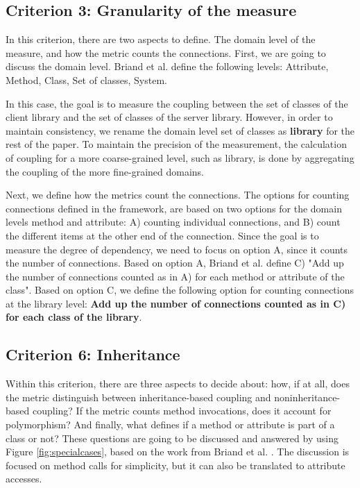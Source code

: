 \documentclass[a4paper]{article}
\begin{document}
\subsection{Criterion 3: Granularity of the measure}
In this criterion, there are two aspects to define. The domain level of the measure, and how the metric counts the connections. First, we are going to discuss the domain level. Briand et al. define the following levels: Attribute, Method, Class, Set of classes, System.

In this case, the goal is to measure the coupling between the set of classes of the client library and the set of classes of the server library. However, in order to maintain consistency, we rename the domain level set of classes as \textbf{library} for the rest of the paper. To maintain the precision of the measurement, the calculation of coupling for a more coarse-grained level, such as library, is done by aggregating the coupling of the more fine-grained domains.

Next, we define how the metrics count the connections. The options for counting connections defined in the framework, are based on two options for the domain levels method and attribute: A) counting individual connections, and B) count the different items at the other end of the connection. Since the goal is to measure the degree of dependency, we need to focus on option A, since it counts the number of connections. Based on option A, Briand et al. define C) "Add up the number of connections counted as in A) for each method or attribute of the class". Based on option C, we define the following option for counting connections at the library level: \textbf{Add up the number of connections counted as in C) for each class of the library}.

\subsection{Criterion 6: Inheritance}
Within this criterion, there are three aspects to decide about: how, if at all, does the metric distinguish between inheritance-based coupling and noninheritance-based coupling? If the metric counts method invocations, does it account for polymorphism? And finally, what defines if a method or attribute is part of a class or not? These questions are going to be discussed and answered by using Figure \ref{fig:specialcases}, based on the work from Briand et al. \cite{briand1999unified}. The discussion is focused on method calls for simplicity, but it can also be translated to attribute accesses.
\end{document}
